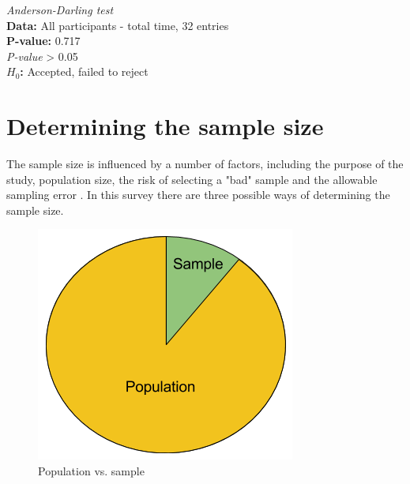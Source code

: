 
\begin{framed}{\noindent\centering
\textit{Anderson-Darling test} \\
\textbf{Data:} All participants - total time, 32 entries\\
  \textbf{P-value:} 0.717  \\
    \textit{P-value} > 0.05\\
  \textbf{$H_{0}$:} Accepted, failed to reject
  \par}
\end{framed}


\section[Sample Size]{Determining the sample size}
The sample size is influenced by a number of factors, including the purpose of the study, population size, the risk of selecting a "bad" sample and the allowable sampling error \citep{Israel1992}. In this survey there are three possible ways of determining the sample size. 

\begin{figure}[h]
	\centering
	\includegraphics[width=0.35\linewidth]{fig/popsample}
	\caption{Population vs. sample}
	\label{fig:popsample}
\end{figure}


